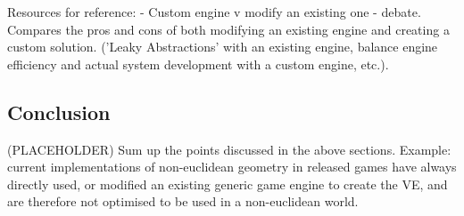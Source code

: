 		Resources for reference:
		\cite{Bruce2012} - Custom engine v modify an existing one - debate. Compares the pros and cons of both modifying an existing engine and creating a custom solution. ('Leaky Abstractions' with an existing engine, balance engine efficiency and actual system development with a custom engine, etc.).
		
	\subsection{Conclusion}
	\label{lr:cross:conclusion}
		(PLACEHOLDER) Sum up the points discussed in the above sections. Example: current implementations of non-euclidean geometry in released games have always directly used, or modified an existing generic game engine to create the VE, and are therefore not optimised to be used in a non-euclidean world.
